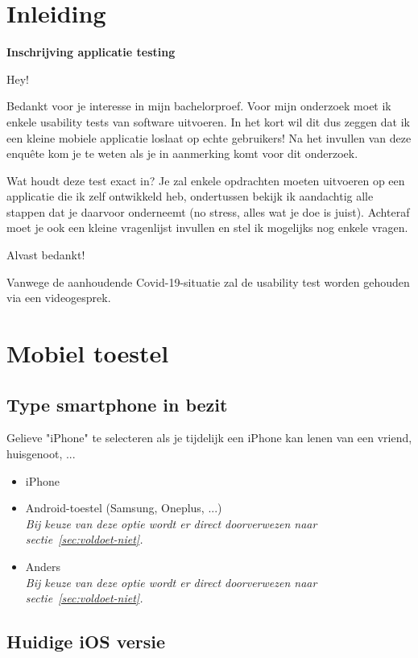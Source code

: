 \section{Inleiding}

\textbf{Inschrijving applicatie testing}

Hey!

Bedankt voor je interesse in mijn bachelorproef. Voor mijn onderzoek moet ik enkele usability tests van software uitvoeren. In het kort wil dit dus zeggen dat ik een kleine mobiele applicatie loslaat op echte gebruikers! Na het invullen van deze enquête kom je te weten als je in aanmerking komt voor dit onderzoek.

Wat houdt deze test exact in? Je zal enkele opdrachten moeten uitvoeren op een applicatie die ik zelf ontwikkeld heb, ondertussen bekijk ik aandachtig alle stappen dat je daarvoor onderneemt (no stress, alles wat je doe is juist). Achteraf moet je ook een kleine vragenlijst invullen en stel ik mogelijks nog enkele vragen.

Alvast bedankt!

Vanwege de aanhoudende Covid-19-situatie zal de usability test worden gehouden via een videogesprek.

\section{Mobiel toestel}

\subsection*{Type smartphone in bezit}

Gelieve "iPhone" te selecteren als je tijdelijk een iPhone kan lenen van een vriend, huisgenoot, ...

\begin{itemize}
    \item iPhone
    \item Android-toestel (Samsung, Oneplus, ...) \\ \textit{Bij keuze van deze optie wordt er direct doorverwezen naar sectie~\ref{sec:voldoet-niet}.}
    \item Anders \\ \textit{Bij keuze van deze optie wordt er direct doorverwezen naar sectie~\ref{sec:voldoet-niet}.}
\end{itemize}

\subsection*{Huidige iOS versie}

